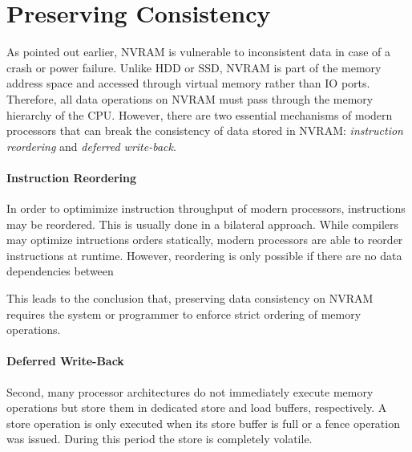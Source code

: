 \section{Preserving Consistency}

As pointed out earlier, NVRAM is vulnerable to inconsistent data in case of
a crash or power failure. Unlike HDD or SSD, NVRAM is part of
the memory address space and accessed through virtual memory rather than IO
ports. Therefore, all data operations on NVRAM must pass through the memory
hierarchy of the CPU. However, there are two essential mechanisms of modern
processors that can break the consistency of data stored in NVRAM:
\emph{instruction reordering} and \emph{deferred write-back}.



\paragraph{Instruction Reordering}


In order to optimimize instruction throughput of modern processors, instructions may be reordered. This is usually done in a bilateral approach. While compilers may optimize intructions orders statically, modern processors are able to reorder instructions at runtime. However, reordering is only possible if there are no data dependencies between


This leads to the conclusion that, preserving data consistency on NVRAM requires the system or programmer to enforce strict ordering of memory operations.

\paragraph{Deferred Write-Back}


Second, many processor architectures do not immediately execute memory
operations but store them in dedicated store and load buffers, respectively. A
store operation is only executed when its store buffer is full or a fence
operation was issued. During this period the store is completely volatile.

